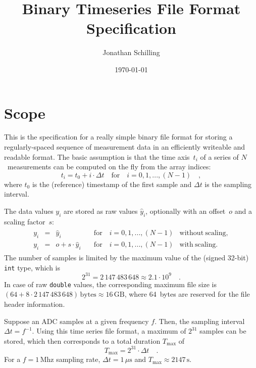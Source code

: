 \documentclass[a4paper,10pt]{article}
\title{Binary Timeseries File Format Specification}
\author{Jonathan Schilling}
\date{\today}
\begin{document}
\maketitle

\section{Scope}\label{sec:scope}

This is the specification for a really simple binary file format for storing a regularly-spaced sequence of measurement data
in an efficiently writeable and readable format.
The basic assumption is that the time axis~$t_i$ of a series of $N$~measurements can be computed on the fly from the array indices:
\begin{equation}
  t_i = t_0 + i \cdot \Delta t \quad \mathrm{for} \quad i = 0, 1, ..., (N-1) \quad ,
\end{equation}
where $t_0$ is the (reference) timestamp of the first sample and $\Delta t$ is the sampling interval.

The data values $y_i$ are stored as raw values $\hat{y}_i$, optionally with an offset~$o$ and a scaling factor~$s$:
\begin{gather}
\begin{aligned}
  y_i & = &             \hat{y}_i & \quad \mathrm{for} \quad i = 0, 1, ..., (N-1) & \mathrm{without~scaling,} \\
  y_i & = & o + s \cdot \hat{y}_i & \quad \mathrm{for} \quad i = 0, 1, ..., (N-1) & \mathrm{with~scaling.}
\end{aligned}
\end{gather}
The number of samples is limited by the maximum value of the (signed 32-bit) \texttt{int} type, which is
\begin{equation}
  2^{31} = 2\,147\,483\,648 \approx 2.1 \cdot 10^9 \quad .
\end{equation}
In case of raw \texttt{double} values, the corresponding maximum file size is $(64 + 8 \cdot 2\,147\,483\,648)\,\mathrm{bytes} \approx 16\,\mathrm{GB}$,
where 64~bytes are reserved for the file header information.

Suppose an ADC samples at a given frequency $f$. Then, the sampling interval $\Delta t = f^{-1}$.
Using this time series file format, a maximum of $2^{31}$ samples can be stored, which then corresponds to a
total duration $T_\mathrm{max}$ of
\begin{equation}
  T_\mathrm{max} = 2^{31} \cdot \Delta t \quad .
\end{equation}
For a $f = 1\,\mathrm{Mhz}$ sampling rate, $\Delta t = 1\,\mu\mathrm{s}$ and $T_\mathrm{max} \approx 2147\,\mathrm{s}$.
\end{document}
